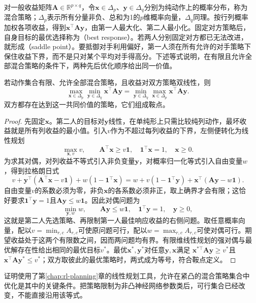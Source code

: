 对一般收益矩阵$\bm A\in\mathbb R^{p\times q}$，令$\bm x\in\Delta_p$、$\bm y\in\Delta_q$分别为纯动作上的概率分布，称为混合策略；$\Delta_p$表示所有分量非负、总和为1的$p$维概率向量，$\Delta_q$同理。按行列概率加权各项收益，得到$\bm x^\top\bm A\bm y$，由第一人最大化、第二人最小化。固定对方策略后，自身目标的最优选择称为（best response）。若两人分别固定对方都已无法改进，就形成（saddle point）。要抵御对手利用偏好，第一人须在所有允许的对手策略下保住收益下界，而不是只对某个平均对手得高分。下述等式说明，在有限且允许全部混合策略的条件下，两种先后优化顺序给出同一价值。

\begin{theorem}[有限零和博弈的极小极大等式]
\label{thm:rl-multi-agent-minimax}
若动作集合有限、允许全部混合策略，且收益对双方策略双线性，则
\[
 \max_{\bm x\in\Delta_p}\min_{\bm y\in\Delta_q}
 \bm x^\top\bm A\bm y
 =
 \min_{\bm y\in\Delta_q}\max_{\bm x\in\Delta_p}
 \bm x^\top\bm A\bm y.
\]
双方都存在达到这一共同价值的策略，它们组成鞍点。
\end{theorem}
\begin{proof}
先固定$\bm x$。第二人的目标对$\bm y$线性，在单纯形上只需比较纯列动作，最坏收益就是所有列收益的最小值。引入$v$作为不超过每列收益的下界，左侧便转化为线性规划
\[
 \max_{\bm x,v}v,\qquad
 \bm A^\top\bm x\geq v\bm 1,\quad
 \bm 1^\top\bm x=1,\quad \bm x\geq0.
\]
为求其对偶，对列收益不等式引入非负变量$\bm y$，对概率归一化等式引入自由变量$w$，得到拉格朗日式
\[
 v+\bm y^\top(\bm A^\top\bm x-v\bm1)
       +w(1-\bm1^\top\bm x)
 =w+v(1-\bm1^\top\bm y)
       +\bm x^\top(\bm A\bm y-w\bm1).
\]
自由变量$v$的系数必须为零，非负$\bm x$的各系数必须非正，取上确界才会有限；这恰好要求$\bm1^\top\bm y=1$且$\bm A\bm y\leq w\bm1$。因此对偶问题为
\[
 \min_{\bm y,w}w,\qquad
 \bm A\bm y\leq w\bm1,\quad
 \bm1^\top\bm y=1,\quad \bm y\geq0,
\]
这就是第二人先选策略、再限制第一人最佳响应收益的右侧问题。取任意概率向量，配以$v=\min_{r,c}A_{r,c}$可使原问题可行，配以$w=\max_{r,c}A_{r,c}$可使对偶可行。期望收益处于这两个有限数之间，因而两问题均有界。有限维线性规划的强对偶与最优解存在性给出相同的最优目标$v^*$。最优$\bm x^*,\bm y^*$对任意$\bm y,\bm x$满足
$\bm x^{*\top}\bm A\bm y\geq v^*$且$\bm x^\top\bm A\bm y^*\leq v^*$；双方取彼此的最优策略时，两式成为等号，符合鞍点定义。
\end{proof}

证明使用了第\ref{chap:rl-planning}章的线性规划工具，允许在紧凸的混合策略集合中优化是其中的关键条件。把策略限制为非凸神经网络参数类后，可行集合已经改变，不能直接沿用该等式。

